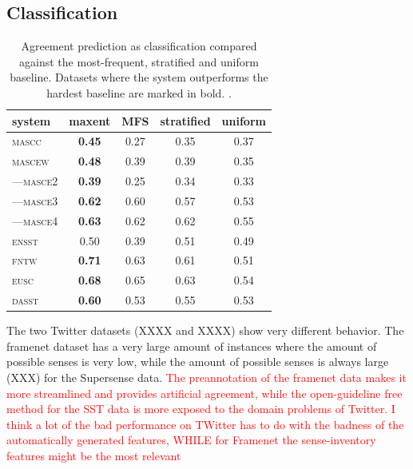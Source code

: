 \documentclass[11pt,a4paper]{article}
\begin{document}
\subsection{Classification}
\begin{table}[Ht!]

\begin{center}
  \begin{tabular}{lc|ccc}
 \toprule
system & maxent & MFS & stratified & uniform\\ 
 \midrule
 \textsc{mascc} & \textbf{0.45} & 0.27 & 0.35 & 0.37\\ 

 \textsc{mascew} & \textbf{0.48} & 0.39 & 0.39 & 0.35\\ 
---\textsc{masce2} & \textbf{0.39} & 0.25 & 0.34 & 0.33\\ 
---\textsc{masce3} & \textbf{0.62} & 0.60 & 0.57 & 0.53\\ 
---\textsc{masce4} & \textbf{0.63} & 0.62 & 0.62 & 0.55\\ 
\textsc{ensst} & 0.50 & 0.39 & 0.51 & 0.49\\ 
\textsc{fntw} & \textbf{0.71} & 0.63 & 0.61 & 0.51\\ 

\textsc{eusc}  & \textbf{0.68} & 0.65 & 0.63 & 0.54 \\
\textsc{dasst} & \textbf{0.60} & 0.53 & 0.55 & 0.53\\ 

\bottomrule

  \end{tabular}  
\end{center}
\caption{Agreement prediction as classification compared against the most-frequent, stratified and uniform baseline. Datasets where the system outperforms the hardest baseline are marked in bold. \label{tab:classresults}.}
\end{table} 

The two Twitter datasets (XXXX and XXXX) show very different behavior. The framenet dataset has a very large  amount of instances where the amount of possible senses is very low, while the amount of possible senses is always large (XXX) for the Supersense data. \textcolor{red}{The preannotation of the framenet data makes it more streamlined and provides artificial agreement, while the open-guideline free method for the SST data is more exposed to the domain problems of Twitter. I think a lot of the bad performance on TWitter has to do with the badness of the automatically generated features, WHILE for Framenet the sense-inventory features might be the most relevant}
\end{document}
